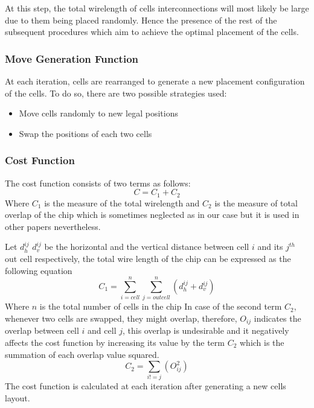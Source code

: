 \documentclass[conference]{IEEEtran}
\begin{document}
At this step, the total wirelength of cells interconnections will most likely be large due to them being placed randomly. Hence the presence of the rest of the subsequent procedures which aim to achieve the optimal placement of the cells.
\medskip

\subsubsection{Move Generation Function}

At each iteration, cells are rearranged to generate a new placement configuration of the cells. To do so, there are two possible strategies used:
\begin{itemize}
    \item Move cells randomly to new legal positions 
    \item Swap the positions of each two cells
\end{itemize}
\medskip

\subsubsection{Cost Function}

The cost function consists of two terms as follows:
\begin{equation}
    C = C_{1} + C_{2}
\end{equation}
Where $C_{1}$ is the measure of the total wirelength and $C_{2}$ is the measure of total overlap of the chip which is sometimes neglected as in our case but it is used in other papers \cite{b16} nevertheless.

Let $d_{h}^{ij}$ $d_{v}^{ij}$ be the horizontal and the vertical distance between cell $i$ and its $j^{th}$ out cell respectively, the total wire length of the chip can be expressed as the following equation 
\begin{equation}
    C_{1} = \sum_{i=cell}^{n} \sum_{j=out cell}^{n} (d_{h}^{ij} + d_{v}^{ij})
\end{equation}
Where $n$ is the total number of cells in the chip 
In case of the second term $C_{2}$, whenever two cells are swapped, they might overlap, therefore, $O_{ij}$ indicates the overlap between cell $i$ and cell $j$, this overlap is undesirable and it negatively affects the cost function by increasing its value by the term $C_{2}$ which is the summation of each overlap value squared.
\begin{equation}
    C_{2} = \sum_{i!=j} (O_{ij}^{2})
\end{equation}
The cost function is calculated at each iteration after generating a new cells layout.
\medskip
\end{document}
